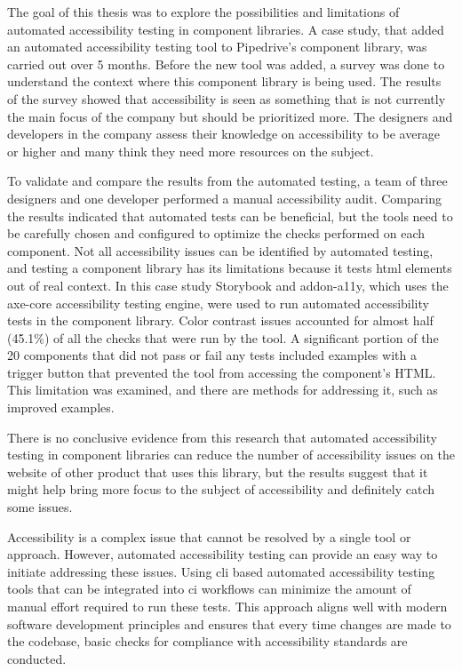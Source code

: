 \documentclass{master_thesis}
\begin{document}
The goal of this thesis was to explore the possibilities and limitations of automated accessibility testing in component libraries. A case study, that added an automated accessibility testing tool to Pipedrive's component library, was carried out over 5 months.  Before the new tool was added, a survey was done to understand the context where this component library is being used. The results of the survey showed that accessibility is seen as something that is not currently the main focus of the company but should be prioritized more. The designers and developers in the company assess their knowledge on accessibility to be average or higher and many think they need more resources on the subject.

To validate and compare the results from the automated testing, a team of three designers and one developer performed a manual accessibility audit. Comparing the results indicated that automated tests can be beneficial, but the tools need to be carefully chosen and configured to optimize the checks performed on each component. Not all accessibility issues can be identified by automated testing, and testing a component library has its limitations because it tests \ac{html} elements out of real context. In this case study Storybook and addon-a11y, which uses the axe-core accessibility testing engine, were used to run automated accessibility tests in the component library. Color contrast issues accounted for almost half (45.1\%) of all the checks that were run by the tool. A significant portion of the 20 components that did not pass or fail any tests included examples with a trigger button that prevented the tool from accessing the component's HTML. This limitation was examined, and there are methods for addressing it, such as improved examples.

There is no conclusive evidence from this research that automated accessibility testing in component libraries can reduce the number of accessibility issues on the website of other product that uses this library, but the results suggest that it might help bring more focus to the subject of accessibility and definitely catch some issues.

Accessibility is a complex issue that cannot be resolved by a single tool or approach. However, automated accessibility testing can provide an easy way to initiate addressing these issues. Using \ac{cli} based automated accessibility testing tools that can be integrated into \ac{ci} workflows can minimize the amount of manual effort required to run these tests. This approach aligns well with modern software development principles and ensures that every time changes are made to the codebase, basic checks for compliance with accessibility standards are conducted.
\end{document}
